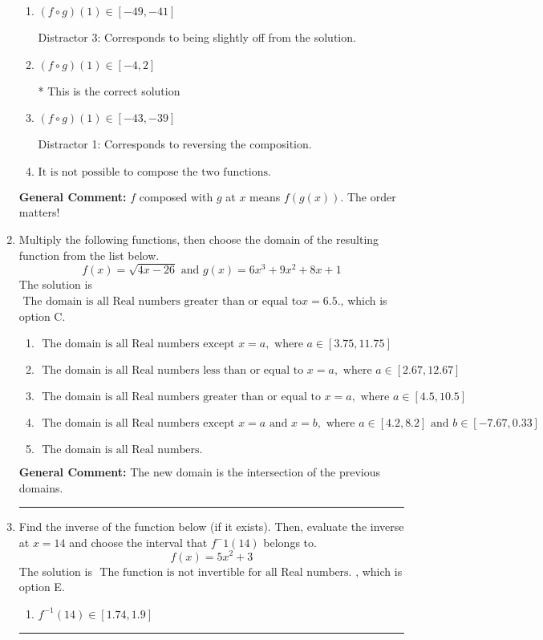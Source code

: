 \documentclass{extbook}[14pt]
\newcommand{\litem}[1]{\item #1

\rule{\textwidth}{0.4pt}}
\begin{document}
\begin{enumerate}
{\begin{enumerate}[label=\Alph*.]
 Distractor 2: Corresponds to being slightly off from the solution.
\item \( (f \circ g)(1) \in [-49, -41] \)

 Distractor 3: Corresponds to being slightly off from the solution.
\item \( (f \circ g)(1) \in [-4, 2] \)

* This is the correct solution
\item \( (f \circ g)(1) \in [-43, -39] \)

 Distractor 1: Corresponds to reversing the composition.
\item \( \text{It is not possible to compose the two functions.} \)


\end{enumerate}

\textbf{General Comment:} $f$ composed with $g$ at $x$ means $f(g(x))$. The order matters!
}
\litem{
Multiply the following functions, then choose the domain of the resulting function from the list below.
\[ f(x) = \sqrt{4x-26}  \text{ and } g(x) = 6x^{3} +9 x^{2} +8 x + 1 \]The solution is \( \text{ The domain is all Real numbers greater than or equal to} x = 6.5. \), which is option C.\begin{enumerate}[label=\Alph*.]
\item \( \text{ The domain is all Real numbers except } x = a, \text{ where } a \in [3.75, 11.75] \)


\item \( \text{ The domain is all Real numbers less than or equal to } x = a, \text{ where } a \in [2.67, 12.67] \)


\item \( \text{ The domain is all Real numbers greater than or equal to } x = a, \text{ where } a \in [4.5, 10.5] \)


\item \( \text{ The domain is all Real numbers except } x = a \text{ and } x = b, \text{ where } a \in [4.2, 8.2] \text{ and } b \in [-7.67, 0.33] \)


\item \( \text{ The domain is all Real numbers. } \)


\end{enumerate}

\textbf{General Comment:} The new domain is the intersection of the previous domains.
}
\litem{
Find the inverse of the function below (if it exists). Then, evaluate the inverse at $x = 14$ and choose the interval that $f^-1(14)$ belongs to.
\[ f(x) = 5 x^2 + 3 \]The solution is \( \text{ The function is not invertible for all Real numbers. } \), which is option E.\begin{enumerate}[label=\Alph*.]
\item \( f^{-1}(14) \in [1.74, 1.9] \)


\end{enumerate}}
\end{enumerate}
\end{document}
